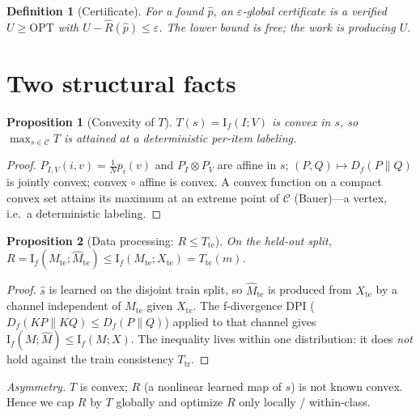 \documentclass[11pt]{article}
\newtheorem{proposition}{Proposition}
\newtheorem{definition}{Definition}
\newcommand{\Iv}{\mathrm{I}}
\newcommand{\Mhat}{\widehat{M}}
\newcommand{\Cspace}{\mathcal{C}}
\newcommand{\tr}{\mathrm{tr}}
\newcommand{\te}{\mathrm{te}}
\begin{document}
\begin{definition}[Certificate]
For a found $\hat p$, an $\varepsilon$-global certificate is a verified $U\ge\mathrm{OPT}$ with
$U-\widehat R(\hat p)\le\varepsilon$. The lower bound is free; the work is producing $U$.
\end{definition}

\section{Two structural facts}

\begin{proposition}[Convexity of $T$]\label{prop:conv}
$T(s)=\Iv_f(I;V)$ is convex in $s$, so $\max_{s\in\Cspace}T$ is attained at a deterministic per-item
labeling.
\end{proposition}
\begin{proof}
$P_{I,V}(i,v)=\tfrac1N p_i(v)$ and $P_I\otimes P_V$ are affine in $s$; $(P,Q)\mapsto D_f(P\|Q)$ is jointly
convex; convex $\circ$ affine is convex. A convex function on a compact convex set attains its maximum at
an extreme point of $\Cspace$ (Bauer)---a vertex, i.e.\ a deterministic labeling.
\end{proof}

\begin{proposition}[Data processing: $R\le T_\te$]\label{prop:dpi}
On the held-out split, $R=\Iv_f(M_\te;\Mhat_\te)\le \Iv_f(M_\te;X_\te)=T_\te(m)$.
\end{proposition}
\begin{proof}
$\hat s$ is learned on the disjoint train split, so $\Mhat_\te$ is produced from $X_\te$ by a channel
independent of $M_\te$ given $X_\te$. The f-divergence DPI ($D_f(KP\|KQ)\le D_f(P\|Q)$) applied to that
channel gives $\Iv_f(M;\Mhat)\le\Iv_f(M;X)$. The inequality lives within one distribution: it does
\emph{not} hold against the train consistency $T_\tr$.
\end{proof}

\noindent\emph{Asymmetry.} $T$ is convex; $R$ (a nonlinear learned map of $s$) is not known convex. Hence
we cap $R$ by $T$ globally and optimize $R$ only locally / within-class.
\end{document}
